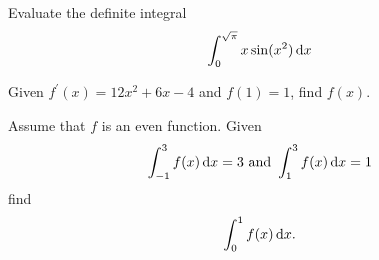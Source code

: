 \documentclass[12pt]{amsart}
\begin{document}
\vspace{3in}

\begin{thm}[10 Points]
  Evaluate the definite integral
  \[\int_0^{\sqrt{\pi}} x\sin(x^2)\dif x\]
\end{thm}

\newpage

\begin{thm}[10 Points]
  Given \(f^\prime(x) = 12x^2 + 6x - 4\) and \(f(1) = 1\), find \(f(x)\).
\end{thm}

\vspace{3in}

\begin{thm}[10 Points]
  Assume that \(f\) is an even function.
  Given
  \[\int_{-1}^3 f(x)\dif x = 3\ \text{and}\ \int_1^{3} f(x)\dif x = 1\]
  find
  \[\int_0^{1} f(x)\dif x.\]
\end{thm}
\end{document}
